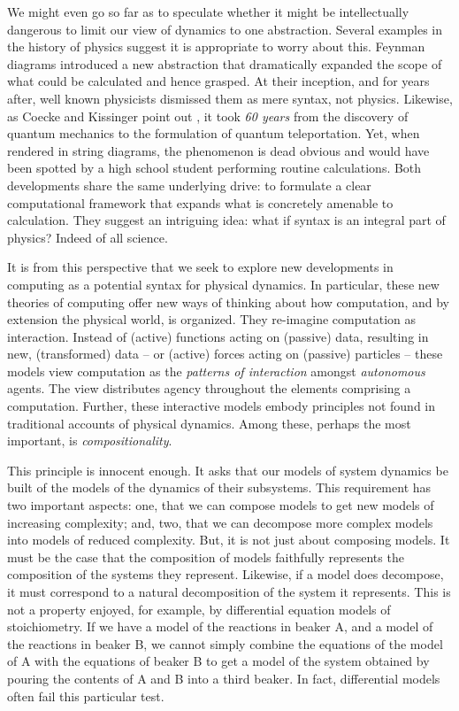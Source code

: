 We might even go so far as to speculate whether it might be
intellectually dangerous to limit our view of dynamics to one
abstraction. Several examples in the history of physics suggest it is
appropriate to worry about this. Feynman diagrams introduced a new
abstraction that dramatically expanded the scope of what could be
calculated and hence grasped. At their inception, and for years after,
well known physicists dismissed them as mere syntax, not
physics. Likewise, as Coecke and Kissinger point out \cite{DBLP:books/cu/CK2017}, it took \emph{60
  years} from the discovery of quantum mechanics to the formulation of
quantum teleportation. Yet, when rendered in string diagrams, the
phenomenon is dead obvious and would have been spotted by a high
school student performing routine calculations. Both developments
share the same underlying drive: to formulate a clear computational
framework that expands what is concretely amenable to
calculation. They suggest an intriguing idea: what if syntax is an
integral part of physics? Indeed of all science.

It is from this perspective that we seek to explore new developments
in computing as a potential syntax for physical dynamics. In
particular, these new theories of computing offer new ways of thinking
about how computation, and by extension the physical world, is
organized. They re-imagine computation as interaction. Instead of
(active) functions acting on (passive) data, resulting in new,
(transformed) data -- or (active) forces acting on (passive) particles
-- these models view computation as the \emph{patterns of interaction}
amongst \emph{autonomous} agents. The view distributes agency
throughout the elements comprising a computation. Further, these
interactive models embody principles not found in traditional accounts
of physical dynamics. Among these, perhaps the most important, is
\emph{compositionality}.

This principle is innocent enough. It asks that our models of system
dynamics be built of the models of the dynamics of their
subsystems. This requirement has two important aspects: one, that we
can compose models to get new models of increasing complexity; and,
two, that we can decompose more complex models into models of reduced
complexity. But, it is not just about composing models. It must be the
case that the composition of models faithfully represents the
composition of the systems they represent. Likewise, if a model does
decompose, it must correspond to a natural decomposition of the system
it represents. This is not a property enjoyed, for example, by
differential equation models of stoichiometry. If we have a model of
the reactions in beaker A, and a model of the reactions in beaker B,
we cannot simply combine the equations of the model of A with the
equations of beaker B to get a model of the system obtained by pouring
the contents of A and B into a third beaker. In fact, differential
models often fail this particular test.

